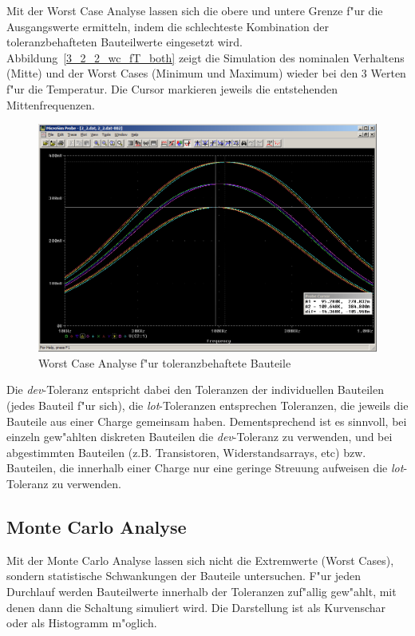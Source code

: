Mit der Worst Case Analyse lassen sich die obere und untere Grenze f"ur die Ausgangswerte ermitteln, indem die schlechteste Kombination der toleranzbehafteten Bauteilwerte eingesetzt wird. Abbildung~\ref{3_2_2_wc_fT_both} zeigt die Simulation des nominalen Verhaltens (Mitte) und der Worst Cases (Minimum und Maximum) wieder bei den 3 Werten f"ur die Temperatur. Die Cursor markieren jeweils die entstehenden Mittenfrequenzen.

\begin{figure}%
	\centering
	\includegraphics[width=\textwidth]{fig/bsp2/3_2_2_wc_fT_both.PNG}
	\caption{Worst Case Analyse f"ur toleranzbehaftete Bauteile}
	\label{fig:3_2_2_wc_fT_both}
\end{figure}

Die \emph{dev}-Toleranz entspricht dabei den Toleranzen der individuellen Bauteilen (jedes Bauteil f"ur sich), die \emph{lot}-Toleranzen entsprechen Toleranzen, die jeweils die Bauteile aus einer Charge gemeinsam haben. Dementsprechend ist es sinnvoll, bei einzeln gew"ahlten diskreten Bauteilen die \emph{dev}-Toleranz zu verwenden, und bei abgestimmten Bauteilen (z.B. Transistoren, Widerstandsarrays, etc) bzw. Bauteilen, die innerhalb einer Charge nur eine geringe Streuung aufweisen die \emph{lot}-Toleranz zu verwenden.


\subsection{Monte Carlo Analyse}

Mit der Monte Carlo Analyse lassen sich nicht die Extremwerte (Worst Cases), sondern statistische Schwankungen der Bauteile untersuchen. F"ur jeden Durchlauf werden Bauteilwerte innerhalb der Toleranzen zuf"allig gew"ahlt, mit denen dann die Schaltung simuliert wird. Die Darstellung ist als Kurvenschar oder als Histogramm m"oglich.

